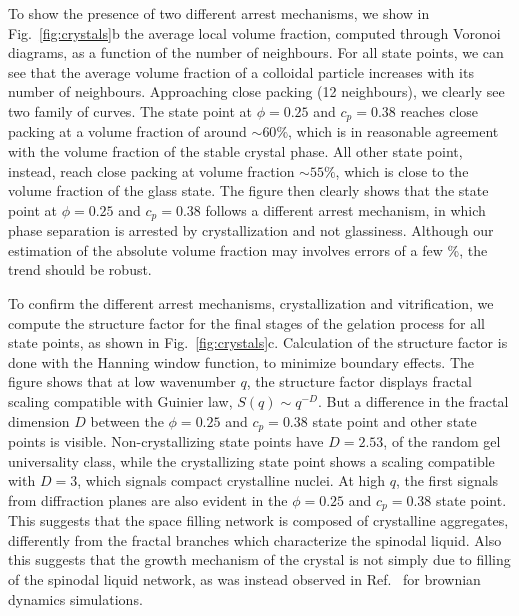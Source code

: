 \documentclass[a4paper,preprint,superscriptaddress]{revtex4}
\begin{document}
To show the presence of two different arrest mechanisms, we show in Fig.~\ref{fig:crystals}b the average local volume fraction, computed
through Voronoi diagrams, as a function of the number of neighbours. For all state points, we can see that the average volume fraction of a colloidal
particle increases with its number of neighbours. Approaching close packing (12 neighbours), we clearly see two family of curves. The state point
at $\phi=0.25$ and $c_p=0.38$ reaches close packing at a volume fraction of around $\sim 60\%$, which is in reasonable agreement with the
volume fraction of the stable crystal phase. All other state point, instead, reach close packing at volume fraction $\sim 55\%$, which is
close to the volume fraction of the glass state. 
The figure then clearly shows that the state point at $\phi=0.25$ and $c_p=0.38$ follows a different arrest mechanism, in which phase separation
is arrested by crystallization and not glassiness. Although our estimation of the absolute volume fraction may involves errors of a few \%, the trend should be robust. 

To confirm the different arrest mechanisms, crystallization and vitrification, we compute the structure factor for the final stages of the gelation process for all state points,
as shown in Fig.~\ref{fig:crystals}c. Calculation of the structure factor is done with the Hanning window function, to minimize boundary effects.
The figure shows that at low wavenumber $q$, the structure factor displays fractal scaling compatible with Guinier law, $S(q)\sim q^{-D}$. But a difference
in the fractal dimension $D$ between the $\phi=0.25$ and $c_p=0.38$ state point and other state points is visible. Non-crystallizing state
points have $D=2.53$, of the random gel universality class, while the crystallizing state point shows a scaling compatible with $D=3$, which
signals compact crystalline nuclei. At high $q$, the first signals from diffraction planes are also evident in the $\phi=0.25$ and $c_p=0.38$ state
point. This suggests that the space filling network is composed of crystalline aggregates, differently from the fractal branches which characterize the
spinodal liquid. Also this suggests that the growth mechanism of the crystal is not simply due to filling of the spinodal liquid network, as was
instead observed in Ref.~\cite{fortini2008crystallization,perez2011pathways} for brownian dynamics simulations.
\end{document}
